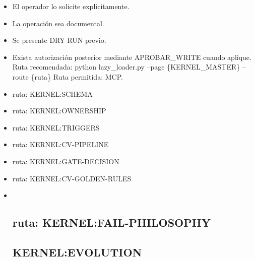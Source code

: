 \documentclass[
]{article}
\begin{document}
\begin{itemize}
  \subsection{KERNEL:ROUTING}\label{kernelrouting}

  \subsubsection{Rutas de Carga (MCP)}\label{rutas-de-carga-mcp}

  Para consultar lógica pesada, prioriza Terminal. Alternativamente, MCP
  puede utilizarse cuando:
\item
  El operador lo solicite explícitamente.
\item
  La operación sea documental.
\item
  Se presente DRY RUN previo.
\item
  Exista autorización posterior mediante APROBAR\_WRITE cuando aplique.
  Ruta recomendada: python lazy\_loader.py --page \{KERNEL\_MASTER\}
  --route \{ruta\} Ruta permitida: MCP.
\item
  ruta: KERNEL:SCHEMA
\item
  ruta: KERNEL:OWNERSHIP
\item
  ruta: KERNEL:TRIGGERS
\item
  ruta: KERNEL:CV-PIPELINE
\item
  ruta: KERNEL:GATE-DECISION
\item
  ruta: KERNEL:CV-GOLDEN-RULES
\item ~
  \subsection{ruta:
  KERNEL:FAIL-PHILOSOPHY}\label{ruta-kernelfail-philosophy}

  \subsection{KERNEL:EVOLUTION}\label{kernelevolution}
\end{itemize}
\end{document}
